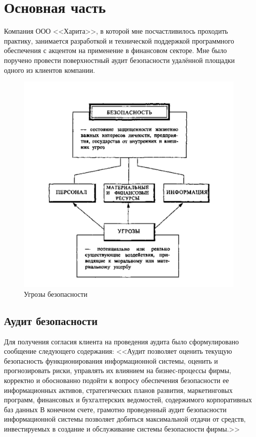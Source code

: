 \chapter{Основная часть}

Компания ООО <<Харита>>, в которой мне посчастливилось проходить практику, занимается разработкой и технической поддержкой программного обеспечения с акцентом на применение в финансовом секторе. Мне было поручено провести поверхностный аудит безопасности удалённой площадки одного из клиентов компании.

\begin{figure}
	\caption{Угрозы безопасности}
	\includegraphics[width=\textwidth]{images/main_scheme.png}
\end{figure}

\section{Аудит безопасности}

Для получения согласия клиента на проведения аудита было сформулировано сообщение следующего содержания:  <<Аудит позволяет оценить текущую безопасность функционирования информационной системы, оценить и прогнозировать риски, управлять их влиянием на бизнес-процессы фирмы, корректно и обоснованно подойти к вопросу обеспечения безопасности ее информационных активов, стратегических планов развития, маркетинговых программ, финансовых и бухгалтерских ведомостей, содержимого корпоративных баз данных В конечном
счете, грамотно проведенный аудит безопасности информационной системы позволяет добиться максимальной отдачи от средств, инвестируемых в создание и обслуживание системы безопасности
фирмы.>>

